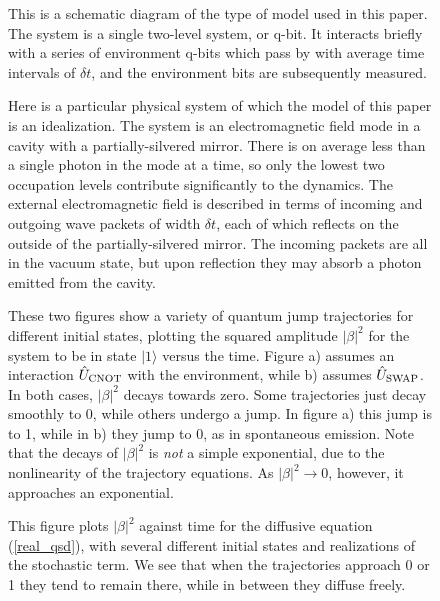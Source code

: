 \documentclass[12pt]{article}
\def\ket#1{{| #1 \rangle}}
\def\U{{\hat U}}
\begin{document}
\eject
\vfil

\begin{figure}
\begin{center}
\label{fig1}
\end{center}
\caption{This is a schematic diagram of the type of model used in
this paper.  The system is a single two-level system, or q-bit.  It
interacts briefly with a series of environment q-bits which pass by
with average time intervals of $\delta t$, and the environment bits
are subsequently measured.}
\end{figure}

\eject
\vfil

\begin{figure}
\begin{center}
\label{fig2}
\end{center}
\caption{Here is a particular physical system of which the model
of this paper is an idealization.  The system is an electromagnetic
field mode in a cavity with a partially-silvered mirror.  There is on
average less than a single photon in the mode at a time, so only the
lowest two occupation levels contribute significantly to the dynamics.
The external electromagnetic field is described in terms of incoming
and outgoing wave packets of width $\delta t$, each of which reflects
on the outside of the partially-silvered mirror.  The incoming packets
are all in the vacuum state, but upon reflection they may absorb a
photon emitted from the cavity.}
\end{figure}

\eject
\vfil

\begin{figure}
\begin{center}
\label{fig3}
\end{center}
\caption{These two figures show a variety of quantum jump trajectories
for different initial states, plotting the squared amplitude $|\beta|^2$
for the system to be in state $\ket1$ versus the time.
Figure a) assumes an interaction
$\U_{\rm CNOT}$ with the environment, while b) assumes $\U_{\rm SWAP}$.
In both cases, $|\beta|^2$ decays towards zero.  Some trajectories just
decay smoothly to 0, while others undergo a jump.  In figure a) this
jump is to 1, while in b) they jump to 0, as in spontaneous emission.
Note that the decays of $|\beta|^2$ is {\it not} a simple exponential,
due to the nonlinearity of the trajectory equations.  As
$|\beta|^2 \rightarrow 0$, however, it approaches an exponential.}
\end{figure}

\eject
\vfil

\begin{figure}
\begin{center}
\label{fig4}
\end{center}
\caption{This figure plots $|\beta|^2$ against time for the diffusive
equation (\ref{real_qsd}), with several different initial states and
realizations of the stochastic term.  We see that when the trajectories
approach 0 or 1 they tend to remain there, while in between they diffuse
freely.}
\end{figure}
\end{document}
